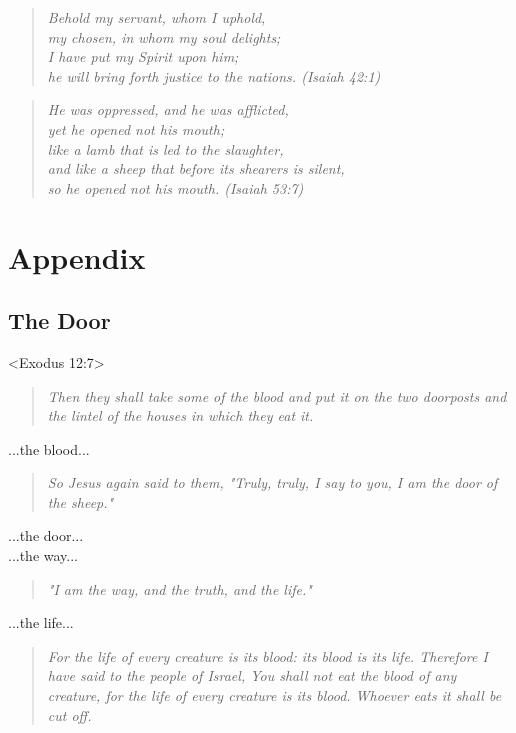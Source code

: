 \documentclass[10pt,oneside,footinclude=true,headinclude=true]{scrbook} %
\newcommand\quot[1]{
	\begin{quote}\textit{\small#1}\end{quote}
}
\begin{document}
\quot{Behold my servant, whom I uphold,\\
\hspace*{5mm}my chosen, in whom my soul delights;\\
I have put my Spirit upon him;\\
\hspace*{5mm}he will bring forth justice to the nations. (Isaiah 42:1)}

\quot{He was oppressed, and he was afflicted,\\
\hspace*{5mm}yet he opened not his mouth;\\
like a lamb that is led to the slaughter,\\
\hspace*{5mm}and like a sheep that before its shearers is silent,\\
\hspace*{5mm}so he opened not his mouth. (Isaiah 53:7)}


\appendix
\cleardoublepage
\part{Appendix}


\chapter{The Door}
<Exodus 12:7>
\quot{Then they shall take some of the blood and put it on the two doorposts and the lintel of the houses in which they eat it.}

\noindent...the blood...

\quot{So Jesus again said to them, "Truly, truly, I say to you, I am the door of the sheep."}

\noindent...the door...\\
...the way...

\quot{"I am the way, and the truth, and the life."}

\noindent...the life...

\quot{For the life of every creature is its blood: its blood is its life. Therefore I have said to the people of Israel, You shall not eat the blood of any creature, for the life of every creature is its blood. Whoever eats it shall be cut off.}
\end{document}
